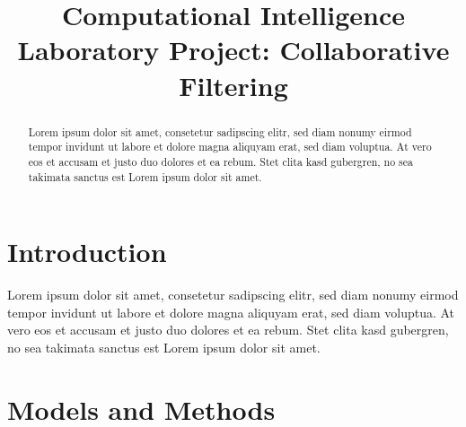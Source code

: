 \documentclass[10pt,conference,compsocconf]{IEEEtran}
\begin{document}
\title{Computational Intelligence Laboratory Project: Collaborative Filtering}

\author{

}
\maketitle

\begin{abstract}


  Lorem ipsum dolor sit amet, consetetur sadipscing elitr, sed diam nonumy
  eirmod tempor invidunt ut labore et dolore magna aliquyam erat, sed diam
  voluptua. At vero eos et accusam et justo duo dolores et ea rebum. Stet clita
  kasd gubergren, no sea takimata sanctus est Lorem ipsum dolor sit
  amet.
\end{abstract}

\section{Introduction}
\label{sec:introduction}

Lorem ipsum dolor sit amet, consetetur sadipscing elitr, sed diam nonumy eirmod
tempor invidunt ut labore et dolore magna aliquyam erat, sed diam voluptua. At
vero eos et accusam et justo duo dolores et ea rebum. Stet clita kasd gubergren,
no sea takimata sanctus est Lorem ipsum dolor sit amet.

\section{Models and Methods}
\label{sec:models_and_methods}
\end{document}
